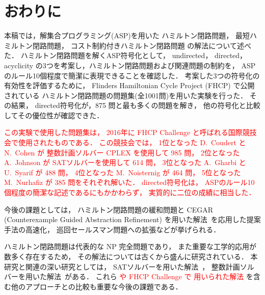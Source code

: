 ﻿%
\section{おわりに}\label{chap:conclusion}

本稿では，解集合プログラミング(ASP)を用いた
ハミルトン閉路問題，
最短ハミルトン閉路問題，
コスト制約付きハミルトン閉路問題
の解法について述べた．
%
ハミルトン閉路問題を解くASP符号化として，
\textsf{undirected}，
\textsf{directed}，
\textsf{acyclicity}
の3つを考案し，ハミルトン閉路問題および関連問題の制約を，
ASPのルール10個程度で簡潔に表現できることを確認した．
%
考案した3つの符号化の有効性を評価するために，
Flinders Hamiltonian Cycle Project (FHCP) で公開されている
ハミルトン閉路問題の問題集(全1001問)を用いた実験を行った．
その結果，
\textsf{directed}符号化が，875 問と最も多くの問題を解き，
他の符号化と比較してその優位性が確認できた．

\textcolor{red}{
  この実験で使用した問題集は，
  2016年に FHCP Challenge と呼ばれる国際競技会で使用されたものである．
  この競技会では，
  1位となった D.~Coudert と N.~Cohen が
  整数計画ソルバー CPLEX を使用して 985 問\cite{cohen17:1001graph}，
  2位となった A.~Johnson が 
  SATソルバーを使用して 614 問\cite{andrew18:triple}，
  3位となった A.~Gharbi と U.~Syarif が 488 問，
  4位となった M.~Noisternig が 464 問，
  5位となった M.~Nurhafiz が 385 問をそれぞれ解いた\cite{haythorpe19:fhcp}．
  \textsf{directed}符号化は，
  ASPのルール10個程度の簡潔な記述であるにもかかわらず，
  実質的に二位の成績に相当した．
}

今後の課題としては，
ハミルトン閉路問題の緩和問題と
CEGAR (Counterexample Guided Abstraction Refinement)
を用いた解法~\cite{soh14:jelia2014,soh20:cegar}を応用した提案手法の高速化，
巡回セールスマン問題への拡張などが挙げられる．

ハミルトン閉路問題は代表的な NP 完全問題であり，
また重要な工学的応用が数多く存在するため，
その解法については古くから盛んに研究されている．
本研究と関連の深い研究としては，
SATソルバーを用いた解法~\cite{Prestwich03:DAM,VelevG09:relative,soh14:jelia2014}，
整数計画ソルバーを用いた解法~\cite{numata11:tsp}がある．
これら
\textcolor{red}{
  や FHCP Challenge で 用いられた解法\cite{cohen17:1001graph,andrew18:triple}
}を含む他のアプローチとの比較も重要な今後の課題である．


